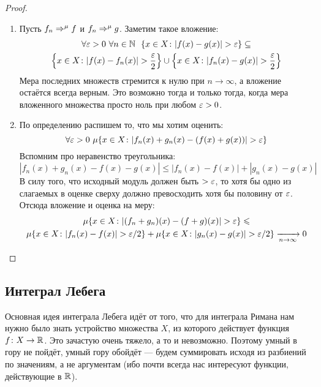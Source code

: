 \begin{proof}
	\begin{enumerate}
		\item Пусть $f_n \Rightarrow^\mu f$ и $f_n \Rightarrow^\mu g$. Заметим такое вложение:
		\begin{multline*}
			\forall \varepsilon > 0\ \forall n \in \mathbb{N}\ \ \{x \in X \colon |f(x) - g(x)| > \varepsilon\} \subseteq
			\\
			\left\{x \in X \colon |f(x) - f_n(x)| > \frac{\varepsilon}{2}\right\} \cup \left\{x \in X \colon |f_n(x) - g(x)| > \frac{\varepsilon}{2}\right\}
		\end{multline*}
		Мера последних множеств стремится к нулю при $n \to \infty$, а вложение остаётся всегда верным. Это возможно тогда и только тогда, когда мера вложенного множества просто ноль при любом $\varepsilon > 0$.
		
		\item По определению распишем то, что мы хотим оценить:
		\[
			\forall \varepsilon > 0\ \mu\{x \in X \colon |f_n(x) + g_n(x) - (f(x) + g(x))| > \varepsilon\}
		\]
		Вспомним про неравенство треугольника:
		\[
			|f_n(x) + g_n(x) - f(x) - g(x)| \le |f_n(x) - f(x)| + |g_n(x) - g(x)|
		\]
		В силу того, что исходный модуль должен быть $> \varepsilon$, то хотя бы одно из слагаемых в оценке сверху должно превосходить хотя бы половину от $\varepsilon$. Отсюда вложение и оценка на меру:
		\begin{multline*}
			\mu\{x \in X \colon |(f_n + g_n)(x) - (f + g)(x)| > \varepsilon\} \leqslant
			\\
			\mu\{x \in X \colon |f_n(x) - f(x)| > \varepsilon / 2\} + \mu\{x \in X \colon |g_n(x) - g(x)| > \varepsilon / 2\} \xrightarrow[n \to \infty]{} 0
		\end{multline*}
	\end{enumerate}
\end{proof}

\subsection{Интеграл Лебега}

\begin{note}
	Основная идея интеграла Лебега идёт от того, что для интеграла Римана нам нужно было знать устройство множества $X$, из которого действует функция $f \colon X \to \mathbb{R}$. Это зачастую очень тяжело, а то и невозможно. Поэтому умный в гору не пойдёт, умный гору обойдёт --- будем суммировать исходя из разбиений по значениям, а не аргументам (ибо почти всегда нас интересуют функции, действующие в $\mathbb{R}$).
\end{note}

